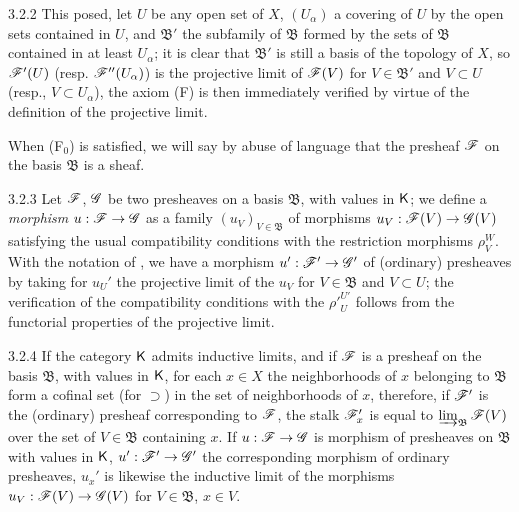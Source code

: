 \begin{env}{3.2.2}
This posed, let $U$ be any open set of $X$, $(U_\alpha)$ a covering of $U$ by the open sets
contained in $U$, and $\mathfrak{B}'$ the subfamily of $\mathfrak{B}$ formed by the sets
of $\mathfrak{B}$ contained in at least $U_\alpha$; it is clear that $\mathfrak{B}'$ is still
a basis of the topology of $X$, so $\mathscr{F}'(U)$ (resp. $\mathscr{F}''(U_\alpha)$) is the
projective limit of $\mathscr{F}(V)$ for $V\in\mathfrak{B}'$ and $V\subset U$
(resp., $V\subset U_\alpha$), the axiom (F) is then immediately verified by virtue of the
definition of the projective limit.

When (F$_0$) is satisfied, we will say by abuse of language that the presheaf $\mathscr{F}$ on the
basis $\mathfrak{B}$ is a sheaf.
\end{env}

\begin{env}{3.2.3}
\label{env-0.3.2.3}
Let $\mathscr{F}$, $\mathscr{G}$ be two presheaves on a basis $\mathfrak{B}$, with values in $\mathsf{K}$; we
define a \emph{morphism} $u:\mathscr{F}\to\mathscr{G}$ as a family $(u_V)_{V\in\mathfrak{B}}$ of
morphisms $u_V:\mathscr{F}(V)\to\mathscr{G}(V)$ satisfying the usual compatibility conditions with the
restriction morphisms $\rho_V^W$. With the notation of , we have a morphism
$u':\mathscr{F}'\to\mathscr{G}'$ of (ordinary) presheaves by taking for $u_U'$ the projective limit of
the $u_V$ for $V\in\mathfrak{B}$ and $V\subset U$; the verification of the compatibility
conditions with the ${\rho'}_U^{U'}$ follows from the functorial properties of the projective
limit.
\end{env}

\begin{env}{3.2.4}
\label{env-0.3.2.4}
If the category $\mathsf{K}$ admits inductive limits, and if $\mathscr{F}$ is a presheaf on the basis
$\mathfrak{B}$, with values in $\mathsf{K}$, for each $x\in X$ the neighborhoods of $x$ belonging to
$\mathfrak{B}$ form a cofinal set (for $\supset$) in the set of neighborhoods of $x$,
therefore, if $\mathscr{F}'$ is the (ordinary) presheaf corresponding to $\mathscr{F}$, the stalk
$\mathscr{F}_x'$ is equal to $\varinjlim_{\mathfrak{B}}\mathscr{F}(V)$ over the set of
$V\in\mathfrak{B}$ containing $x$. If $u:\mathscr{F}\to\mathscr{G}$ is morphism of presheaves on
$\mathfrak{B}$ with values in $\mathsf{K}$, $u':\mathscr{F}'\to\mathscr{G}'$ the corresponding morphism of
ordinary presheaves, $u_x'$ is likewise the inductive limit of the morphisms
$u_V:\mathscr{F}(V)\to\mathscr{G}(V)$ for $V\in\mathfrak{B}$, $x\in V$.
\end{env}

